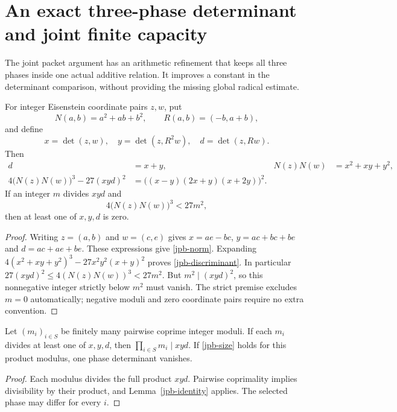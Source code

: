 \section{An exact three-phase determinant and joint finite capacity}
\label{jpb-section}

The joint packet argument has an arithmetic refinement that keeps all
three phases inside one actual additive relation. It improves a constant
in the determinant comparison, without providing the missing global
radical estimate.

\begin{lemma}\label{jpb-identity}
For integer Eisenstein coordinate pairs $z,w$, put
\[
 N(a,b)=a^2+ab+b^2,\qquad R(a,b)=(-b,a+b),
\]
and define
\[
 x=\det(z,w),\quad y=\det(z,R^2w),\quad d=\det(z,Rw).
\]
Then
\begin{align}
 d&=x+y, & N(z)N(w)&=x^2+xy+y^2,\label{jpb-norm}\\
 4\bigl(N(z)N(w)\bigr)^3-27(xyd)^2
   &=\bigl((x-y)(2x+y)(x+2y)\bigr)^2.\label{jpb-discriminant}
\end{align}
If an integer $m$ divides $xyd$ and
\begin{equation}\label{jpb-size}
 4\bigl(N(z)N(w)\bigr)^3<27m^2,
\end{equation}
then at least one of $x,y,d$ is zero.
\end{lemma}
\begin{proof}
Writing $z=(a,b)$ and $w=(c,e)$ gives
$x=ae-bc$, $y=ac+bc+be$ and $d=ac+ae+be$.
These expressions give \eqref{jpb-norm}. Expanding
$4(x^2+xy+y^2)^3-27x^2y^2(x+y)^2$ proves
\eqref{jpb-discriminant}. In particular
$27(xyd)^2\le4(N(z)N(w))^3<27m^2$.
But $m^2\mid(xyd)^2$, so this nonnegative integer strictly below
$m^2$ must vanish. The strict premise excludes $m=0$ automatically;
negative moduli and zero coordinate pairs require no extra convention.
\end{proof}

\begin{proposition}\label{jpb-moduli}
Let $(m_i)_{i\in S}$ be finitely many pairwise coprime integer moduli.
If each $m_i$ divides at least one of $x,y,d$, then
$\prod_{i\in S}m_i\mid xyd$. If \eqref{jpb-size} holds for this
product modulus, one phase determinant vanishes.
\end{proposition}
\begin{proof}
Each modulus divides the full product $xyd$. Pairwise coprimality
implies divisibility by their product, and Lemma~\ref{jpb-identity}
applies. The selected phase may differ for every $i$.
\end{proof}

